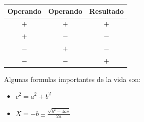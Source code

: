 \begin{table}[h]
  \centering
  \begin{tabular}{| c | c | c |}
    \hline
    Operando & Operando & Resultado\\\hline
    $+$ & $+$ & $+$\\\hline
    $+$ & $-$ & $-$\\\hline
    $-$ & $+$ & $-$\\\hline
    $-$ & $-$ & $+$\\\hline
    \hline
  \end{tabular}
\end{table}

\newpage
Algunas formulas importantes de la vida son:
\begin{itemize}
  \item $c^{2} = a^{2} + b^{2}$
  \item $X= -b \pm \frac{\sqrt{b^{2}-4ac}}{2a}$
    \end{itemize}
